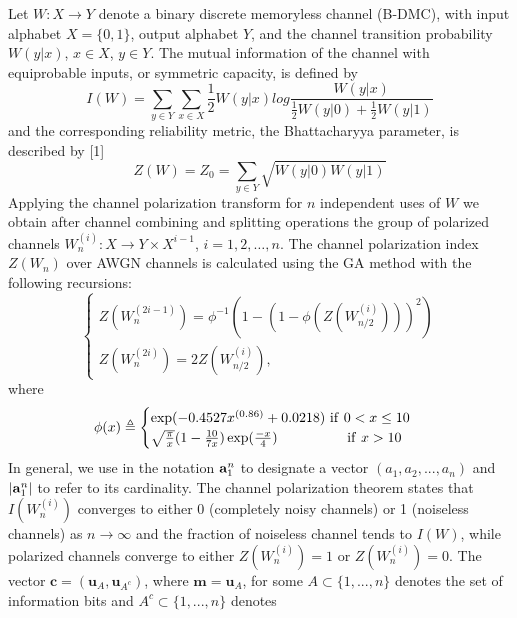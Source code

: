 \documentclass[10pt,twocolumn]{IEEEtran}
\begin{document}
Let $W:X \to Y$ denote a binary discrete memoryless channel (B-DMC),
with input alphabet $X=\{0,1\}$, output alphabet $Y$, and the
channel transition probability $W(y|x)$, $x \in X$, $y \in Y$. The
mutual information of the channel with equiprobable inputs, or
symmetric capacity, is defined by \cite{Arikan}
\begin{equation}
I(W) = \sum\limits_{y \in Y}\sum\limits_{x \in X}\frac{1}{2}W(y|x)log\frac{W(y|x)}{\frac{1}{2}W(y|0)+\frac{1}{2}W(y|1)}
\end{equation}
and the corresponding reliability metric, the Bhattacharyya
parameter, is described by [1]
\begin{equation}
Z(W) = Z_0 = \sum\limits_{y \in Y}\sqrt{W(y|0)W(y|1)}
\end{equation}
Applying the channel polarization transform for $n$ independent uses
of $W$ we obtain after channel combining and splitting operations
the group of polarized channels $W_n^{(i)}:X \to Y \times X^{i-1}$,
$i=1,2, \ldots ,n$. The channel polarization index $Z(W_n)$ over
AWGN channels is calculated using the GA method \cite{Trifonov} with
the following recursions:
\begin{equation}
\begin{cases}
Z(W^{(2i-1)}_n) = \phi^{-1}(1-(1-\phi(Z(W^{(i)}_{n/2})))^2)\\
Z(W^{(2i)}_n) = 2Z(W^{(i)}_{n/2}), \label{index}
\end{cases}
\end{equation}
where
\begin{equation}
\phi(x) \triangleq
\begin{cases}
\exp(-0.4527x^{(0.86)}+0.0218) \ {\rm if} \ 0 < x \leq 10\\
\sqrt{\frac{\pi}{x}}(1-\frac{10}{7x})\exp(\frac{-x}{4}) \ ~~~~~~~~~~~~~~ {\rm if} \ x > 10\\
\end{cases}
\end{equation}
In general, we use in the notation ${\bf a}^n_1$ to designate a
vector $(a_1,a_2,...,a_n)$ and $|{\bf a}^n_1|$ to refer to its
cardinality. The channel polarization theorem \cite{Arikan} states
that $I(W_n^{(i)})$ converges to either 0 (completely noisy
channels) or 1 (noiseless channels) as $n \to \infty$ and the
fraction of noiseless channel tends to $I(W)$, while polarized
channels converge to either $Z(W_n^{(i)})=1$ or $Z(W_n^{(i)})=0$.
The vector $\textbf{c}=(\textbf{u}_A, \textbf{u}_{A^c})$, where
$\textbf{m} = \textbf{u}_A$, for some $A \subset\{1,...,n\}$ denotes
the set of information bits and $A^c \subset \{1,...,n\}$ denotes
\end{document}
